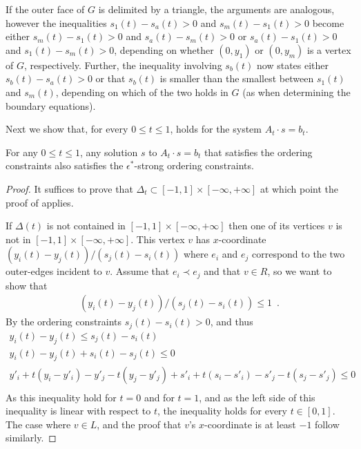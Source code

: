 If the outer face of $G$ is delimited by a triangle, the arguments are analogous, however the inequalities $s_1(t)-s_a(t)>0$ and $s_m(t)-s_1(t)>0$ become either $s_m(t)-s_1(t)>0$ and $s_a(t)-s_m(t)>0$ or $s_a(t)-s_1(t)>0$ and $s_1(t)-s_m(t)>0$, depending on whether $(0,y_1)$ or $(0,y_m)$ is a vertex of $G$, respectively. Further, the inequality involving $s_b(t)$ now states  either $s_b(t)-s_a(t)>0$ or that $s_b(t)$ is smaller than the smallest between $s_1(t)$ and $s_m(t)$, depending on which of the two holds in $G$ (as when determining the boundary equations).

Next we show that, for every $0\le t\le 1$,  holds for the system $A_t\cdot s=b_t$.

\begin{lem}
   For any $0\le t\le 1$, any solution $s$ to $A_t\cdot s = b_t$
   that satisfies the ordering constraints also satisfies the
   $\epsilon^*$-strong ordering constraints. 
\end{lem}

\begin{proof}
  It suffices to prove that $\Delta_t\subset[-1,1]\times[-\infty,+\infty]$ at which point the proof of  applies.

If $\Delta(t)$ is not contained in $[-1,1]\times[-\infty,+\infty]$ then 
one of its vertices $v$ is not in $[-1,1]\times[-\infty,+\infty]$.
This vertex $v$ has $x$-coordinate $( y_i(t) - y_j(t) ) / ( s_j(t) - 
s_i(t) )$ where $e_i$ and $e_j$ correspond to the two outer-edges 
incident to $v$. Assume that $e_i \prec e_j$ and that $v\in R$, so we want to show that
\begin{eqnarray*}
( y_i(t) - y_j(t) ) / ( s_j(t) - s_i(t) )  \le 1 \enspace .
\end{eqnarray*}
By the ordering constraints $s_j(t) - s_i(t) > 0$, and thus
\begin{eqnarray*}
y_i(t) - y_j(t)  \le  s_j(t) - s_i(t) \\
y_i(t) - y_j(t)  + s_i(t)  -  s_j(t)  \le 0\\
y'_i + t(y_i-y'_i) - y'_j - t(y_j-y'_j) + s'_i + t(s_i-s'_i) - s'_j - 
t(s_j-s'_j) \le 0\\
\end{eqnarray*}
As this inequality hold for $t=0$ and for $t=1$, and as the left side of 
this inequality is linear with respect to $t$, the inequality holds for 
every $t\in [0,1]$.
The case where $v\in L$, and the proof that $v$'s $x$-coordinate is at 
least $-1$ follow similarly.
\end{proof}


